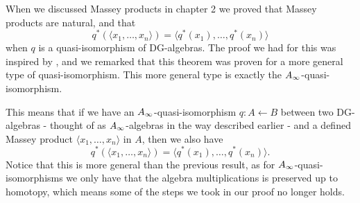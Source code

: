 \begin{remark}
When we discussed Massey products in chapter 2 we proved that Massey products are natural, and that 
\begin{equation*}
	q^*(\langle x_1, \ldots, x_n\rangle ) = \langle q^*(x_1),\ldots, q^*(x_n)\rangle
\end{equation*}
when $q$ is a quasi-isomorphism of DG-algebras. The proof we had for this was inspired by \cite[Theorem 1.5]{naturality}, and we remarked that this theorem was proven for a more general type of quasi-isomorphism. This more general type is exactly the $A_{\infty}$-quasi-isomorphism.

This means that if we have an $A_{\infty}$-quasi-isomorphism $q\colon A\longleftarrow B$ between two DG-algebras - thought of as $A_{\infty}$-algebras in the way described earlier - and a defined Massey product $\langle x_1, \ldots, x_n\rangle$ in $A$, then we also have
\begin{equation*}
	q^*(\langle x_1, \ldots, x_n\rangle ) = \langle q^*(x_1),\ldots, q^*(x_n)\rangle .
\end{equation*}
Notice that this is more general than the previous result, as for $A_{\infty}$-quasi-isomorphisms we only have that the algebra multiplications is preserved up to homotopy, which means some of the steps we took in our proof no longer holds. 
\end{remark}





